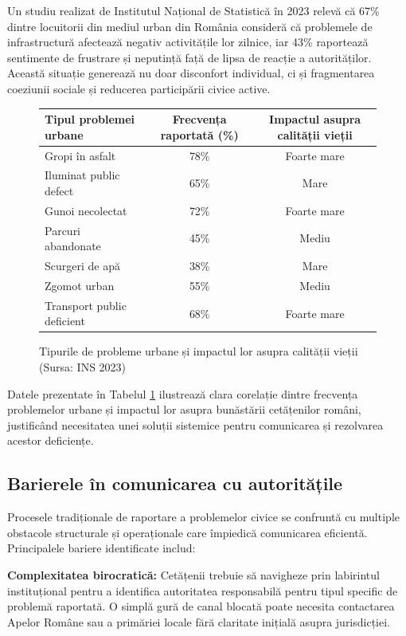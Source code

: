 \documentclass[12pt,a4paper]{report}
\begin{document}
Un studiu realizat de Institutul Național de Statistică în 2023 relevă că 67\% dintre locuitorii din mediul urban din România consideră că problemele de infrastructură afectează negativ activitățile lor zilnice, iar 43\% raportează sentimente de frustrare și neputință față de lipsa de reacție a autorităților. Această situație generează nu doar disconfort individual, ci și fragmentarea coeziunii sociale și reducerea participării civice active.

\begin{figure}[H]
\centering
\begin{tabular}{|l|c|c|}
\hline
\textbf{Tipul problemei urbane} & \textbf{Frecvența raportată (\%)} & \textbf{Impactul asupra calității vieții} \\
\hline
Gropi în asfalt & 78\% & Foarte mare \\
\hline
Iluminat public defect & 65\% & Mare \\
\hline
Gunoi necolectat & 72\% & Foarte mare \\
\hline
Parcuri abandonate & 45\% & Mediu \\
\hline
Scurgeri de apă & 38\% & Mare \\
\hline
Zgomot urban & 55\% & Mediu \\
\hline
Transport public deficient & 68\% & Foarte mare \\
\hline
\end{tabular}
\caption{Tipurile de probleme urbane și impactul lor asupra calității vieții (Sursa: INS 2023)}
\label{tab:probleme_urbane}
\end{figure}

Datele prezentate în Tabelul \ref{tab:probleme_urbane} ilustrează clara corelație dintre frecvența problemelor urbane și impactul lor asupra bunăstării cetățenilor români, justificând necesitatea unei soluții sistemice pentru comunicarea și rezolvarea acestor deficiențe.
\subsection{Barierele în comunicarea cu autoritățile}

Procesele tradiționale de raportare a problemelor civice se confruntă cu multiple obstacole structurale și operaționale care împiedică comunicarea eficientă. Principalele bariere identificate includ:

\textbf{Complexitatea birocratică:} Cetățenii trebuie să navigheze prin labirintul instituțional pentru a identifica autoritatea responsabilă pentru tipul specific de problemă raportată. O simplă gură de canal blocată poate necesita contactarea Apelor Române sau  a primăriei locale fără claritate inițială asupra jurisdicției.
\end{document}
